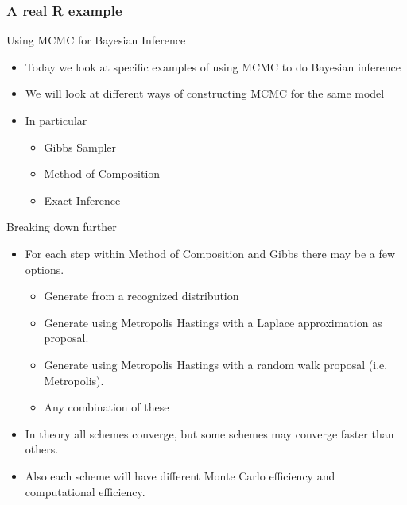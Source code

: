 \documentclass[10pt]{beamer}
\begin{document}
\begin{frame}
  \frametitle{A real R example}

\end{frame}









\begin{frame}{Using MCMC for Bayesian Inference}
  \begin{itemize}
  \item Today we look at specific examples of using MCMC to do Bayesian inference

  \item We will look at different ways of constructing MCMC for the same model

  \item In particular
    \begin{itemize}
    \item Gibbs Sampler
    \item Method of Composition
    \item Exact Inference
    \end{itemize}
  \end{itemize}
\end{frame}
\begin{frame}{Breaking down further}
  \begin{itemize}
  \item For each step within Method of Composition and Gibbs there may be a few options.

    \begin{itemize}
    \item Generate from a recognized distribution
    \item Generate using Metropolis Hastings with a Laplace approximation as proposal.
    \item Generate using Metropolis Hastings with a random walk proposal (i.e. Metropolis).

    \item Any combination of these
    \end{itemize}

  \item In theory all schemes converge, but some schemes may converge faster than others.

  \item Also each scheme will have different Monte Carlo efficiency and computational efficiency.
  \end{itemize}
\end{frame}
\end{document}
